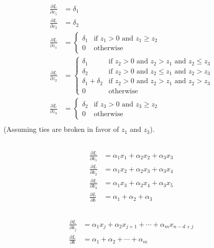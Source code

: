 \documentclass{article}
\numberwithin{equation}{section}
\begin{document}
\subsection{}
\begin{align}
\frac{\partial L}{\partial v_1} &= \delta_1 \\
\frac{\partial L}{\partial v_2} &= \delta_2 \\
\frac{\partial L}{\partial z_1} &=
\begin{cases}
\delta_1 & \text{if } z_1 > 0 \text{ and } z_1 \ge z_2 \\
0 & \text{otherwise}
\end{cases}\\
\frac{\partial L}{\partial z_2} &=
\begin{cases}
\delta_1 & \text{if } z_2 > 0 \text{ and } z_2 > z_1 \text{ and } z_2 \le z_3 \\
\delta_2 & \text{if } z_2 > 0 \text{ and } z_2 \le z_1 \text{ and } z_2 > z_3 \\
\delta_1 + \delta_2 & \text{if } z_2 > 0 \text{ and } z_2 > z_1 \text{ and } z_2 > z_3 \\
0 & \text{otherwise}
\end{cases}\\
\frac{\partial L}{\partial z_3} &=
\begin{cases}
\delta_2 & \text{if } z_3 > 0 \text{ and } z_3 \ge z_2 \\
0 & \text{otherwise}
\end{cases}\\
\end{align}
(Assuming ties are broken in favor of \(z_1\) and \(z_3\)).

\subsection{}
\begin{align}
\frac{\partial L}{\partial k_1} &= \alpha_1 x_1 + \alpha_2 x_2 + \alpha_3 x_3 \\
\frac{\partial L}{\partial k_2} &= \alpha_1 x_2 + \alpha_2 x_3 + \alpha_3 x_4 \\
\frac{\partial L}{\partial k_3} &= \alpha_1 x_3 + \alpha_2 x_4 + \alpha_3 x_5\\
\frac{\partial L}{\partial b} &= \alpha_1 + \alpha_2 + \alpha_3
\end{align}

\subsection{}
\begin{align}
\frac{\partial L}{\partial k_j} &= \alpha_1 x_{j} + \alpha_2 x_{j+1} + \cdots + \alpha_{m} x_{n - d + j} \\
\frac{\partial L}{\partial b} &= \alpha_1 + \alpha_2 + \cdots + \alpha_{m}
\end{align}
\end{document}
